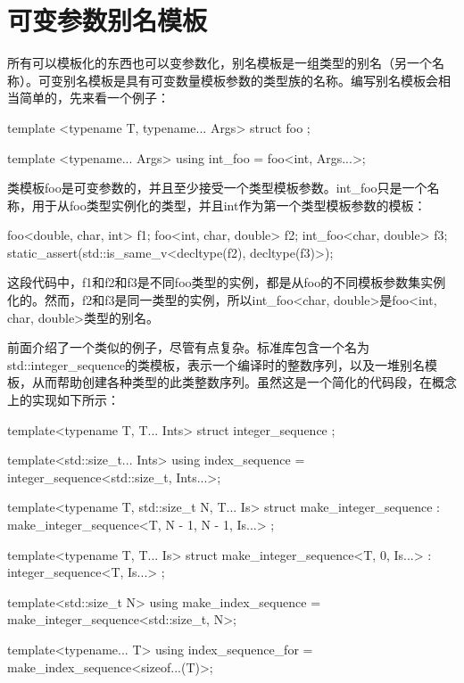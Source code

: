 \section{可变参数别名模板}
所有可以模板化的东西也可以变参数化，别名模板是一组类型的别名（另一个名称）。可变别名模板是具有可变数量模板参数的类型族的名称。编写别名模板会相当简单的，先来看一个例子：

\begin{cppcode}
template <typename T, typename... Args>
struct foo
{
};

template <typename... Args>
using int_foo = foo<int, Args...>;
\end{cppcode}

类模板foo是可变参数的，并且至少接受一个类型模板参数。int_foo只是一个名称，用于从foo类型实例化的类型，并且int作为第一个类型模板参数的模板：

\begin{cppcode}
foo<double, char, int> f1;
foo<int, char, double> f2;
int_foo<char, double> f3;
static_assert(std::is_same_v<decltype(f2), decltype(f3)>);
\end{cppcode}

这段代码中，f1和f2和f3是不同foo类型的实例，都是从foo的不同模板参数集实例化的。然而，f2和f3是同一类型的实例，所以int_foo<char, double>是foo<int, char, double>类型的别名。

前面介绍了一个类似的例子，尽管有点复杂。标准库包含一个名为std::integer_sequence的类模板，表示一个编译时的整数序列，以及一堆别名模板，从而帮助创建各种类型的此类整数序列。虽然这是一个简化的代码段，在概念上的实现如下所示：

\begin{cppcode}
template<typename T, T... Ints>
struct integer_sequence
{};

template<std::size_t... Ints>
using index_sequence = integer_sequence<std::size_t,
								        Ints...>;

template<typename T, std::size_t N, T... Is>
struct make_integer_sequence :
	make_integer_sequence<T, N - 1, N - 1, Is...>
{};

template<typename T, T... Is>
struct make_integer_sequence<T, 0, Is...> :
	integer_sequence<T, Is...>
{};

template<std::size_t N>
using make_index_sequence = make_integer_sequence<std::size_t,
												  N>;

template<typename... T>
using index_sequence_for =
	make_index_sequence<sizeof...(T)>;
\end{cppcode}

